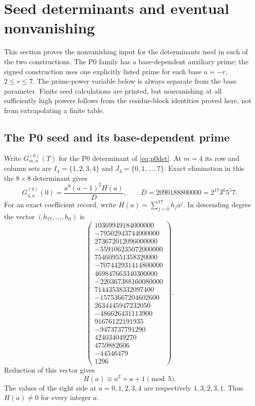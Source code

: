 \section{Seed determinants and eventual nonvanishing}\label{sec:nonvanishing}

This section proves the nonvanishing input for the determinants
used in each of the two constructions.  The P0 family has a base-dependent
auxiliary prime; the signed construction uses one explicitly listed prime for
each base $a=-r$, $2\le r\le7$.  The prime-power variable below is always
separate from the base parameter.  Finite seed calculations are printed, but
nonvanishing at all sufficiently high powers follows from the residue-block
identities proved here, not from extrapolating a finite table.

\subsection{The P0 seed and its base-dependent prime}

Write $G^{(0)}_{m,a}(T)$ for the P0 determinant of
\eqref{eq:p0det}.  At $m=4$ its row and column sets are
$I_4=\{1,2,3,4\}$ and $J_4=\{0,1,\ldots,7\}$.  Exact elimination in this
the $8\times8$ determinant gives
\begin{equation}\label{eq:p0-seed-factor}
 G^{(0)}_{4,a}(0)=\frac{a^9(a-1)^2H(a)}{D},\qquad
 D=2090188800000=2^{17}3^6 5^5 7.
\end{equation}
For an exact coefficient record, write $H(a)=\sum_{j=0}^{17}h_ja^j$.
In descending degree the vector $(h_{17},\ldots,h_0)$ is
\[
\left(\begin{array}{r}
10369949184000000\\
-79502943744000000\\
273672012096000000\\
-559106235072000000\\
754609551358320000\\
-707442931414800000\\
469847663340300000\\
-220367388160080000\\
71443538332097400\\
-15753667204602600\\
2634445947232050\\
-486626431113900\\
91676122191935\\
-9473737791290\\
424034049270\\
4759882606\\
-44546479\\
1296
\end{array}
\right).
\]
Reduction of this vector gives
\begin{equation}\label{eq:p0-seed-mod5}
 H(a)\equiv a^2+a+1\pmod 5.
\end{equation}
The values of the right side at $a=0,1,2,3,4$ are respectively
$1,3,2,3,1$.  Thus $H(a)\ne0$ for every integer $a$.

